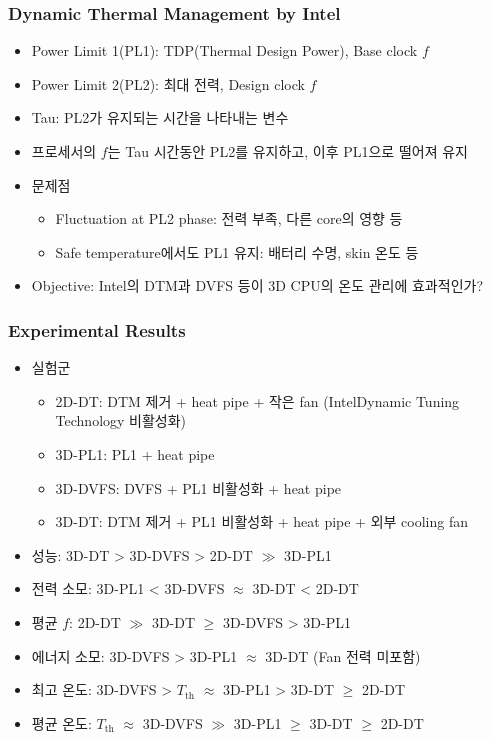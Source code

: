 \subsubsection*{Dynamic Thermal Management by Intel}
\begin{itemize}
    \item Power Limit 1(PL1): TDP(Thermal Design Power), Base clock $f$
    \item Power Limit 2(PL2): 최대 전력, Design clock $f$
    \item Tau: PL2가 유지되는 시간을 나타내는 변수
    \item 프로세서의 $f$는 Tau 시간동안 PL2를 유지하고, 이후 PL1으로 떨어져 유지
    \item 문제점
    \begin{itemize}
        \item Fluctuation at PL2 phase: 전력 부족, 다른 core의 영향 등
        \item Safe temperature에서도 PL1 유지: 배터리 수명, skin 온도 등
    \end{itemize}
    \item Objective: Intel의 DTM과 DVFS 등이 3D CPU의 온도 관리에 효과적인가?
\end{itemize}
\begin{figures}
\end{figures}

\subsubsection*{Experimental Results}
\begin{itemize}
    \item 실험군
    \begin{itemize}
        \item 2D-DT: DTM 제거 + heat pipe + 작은 fan (Intel\textsuperscript\textregistered Dynamic Tuning Technology 비활성화)
        \item 3D-PL1: PL1 + heat pipe
        \item 3D-DVFS: DVFS + PL1 비활성화 + heat pipe
        \item 3D-DT: DTM 제거 + PL1 비활성화 + heat pipe + 외부 cooling fan
    \end{itemize}
    \item 성능: 3D-DT \textgreater{} 3D-DVFS \textgreater{} 2D-DT $\gg$ 3D-PL1
    \item 전력 소모: 3D-PL1 \textless{} 3D-DVFS $\approx$ 3D-DT \textless{} 2D-DT
    \item 평균 $f$: 2D-DT $\gg$ 3D-DT $\geq$ 3D-DVFS \textgreater{} 3D-PL1
    \item 에너지 소모: 3D-DVFS \textgreater{} 3D-PL1 $\approx$ 3D-DT (Fan 전력 미포함)
    \item 최고 온도: 3D-DVFS \textgreater{} $T_\mathrm{th}$ $\approx$ 3D-PL1 \textgreater{} 3D-DT $\geq$ 2D-DT
    \item 평균 온도: $T_\mathrm{th}$ $\approx$ 3D-DVFS $\gg$ 3D-PL1 $\geq$ 3D-DT $\geq$ 2D-DT
\end{itemize}

